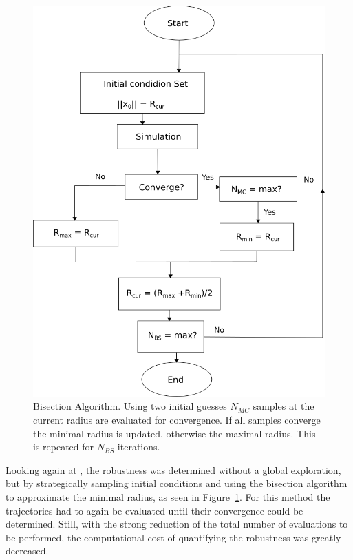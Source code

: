 \begin{figure}[h]
    \centering
    \includegraphics[width=.9\linewidth]{figures/bisection.png}
    \caption{Bisection Algorithm. Using two initial guesses $N_{MC}$ samples at the current radius are evaluated for convergence. If all samples converge the minimal radius is updated, otherwise the maximal radius. This is repeated for $N_{BS}$ iterations. \cite{quant}}
    \label{fig:alg}
\end{figure}

Looking again at \cite{quant}, the robustness was determined without a global exploration, but by strategically sampling initial conditions and using the bisection algorithm to approximate the minimal radius, as seen in Figure~\ref{fig:alg}. For this method the trajectories had to again be evaluated until their convergence could be determined. Still, with the strong reduction of the total number of evaluations to be performed, the computational cost of quantifying the robustness was greatly decreased. 




